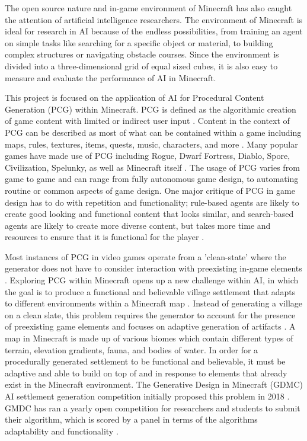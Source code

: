 \documentclass[11pt, oneside]{article}
\begin{document}
\begin{normalsize}
The open source nature and in-game environment of Minecraft has also caught the attention of artificial intelligence researchers. The environment of Minecraft is ideal for research in AI because of the endless possibilities, from training an agent on simple tasks like searching for a specific object or material, to building complex structures or navigating obstacle courses. Since the environment is divided into a three-dimensional grid of equal sized cubes, it is also easy to measure and evaluate the performance of AI in Minecraft.

This project is focused on the application of AI for Procedural Content Generation (PCG) within Minecraft. PCG is defined as the algorithmic creation of game content with limited or indirect user input \cite{shaker2016procedural}. Content in the context of PCG can be described as most of what can be contained within a game including maps, rules, textures, items, quests, music, characters, and more \cite{shaker2016procedural}. Many popular games have made use of PCG including Rogue, Dwarf Fortress, Diablo, Spore, Civilization, Spelunky, as well as Minecraft itself \cite{shaker2016procedural}. The usage of PCG varies from game to game and can range from fully autonomous game design, to  automating routine or common aspects of game design. One major critique of PCG in game design has to do with repetition and functionality; rule-based agents are likely to create good looking and functional content that looks similar, and search-based agents are likely to create more diverse content, but takes more time and resources to ensure that it is functional for the player \cite{green_organic_2019}.

Most instances of PCG in video games operate from a 'clean-state' where the generator does not have to consider interaction with preexisting in-game elements \cite{green_organic_2019}. Exploring PCG within Minecraft opens up a new challenge within AI, in which the goal is to produce a functional and believable village settlement that adapts to different environments within a Minecraft map \cite{salge_generative_2019}. Instead of generating a village on a clean slate, this problem requires the generator to account for the presence of preexisting game elements and focuses on adaptive generation of artifacts \cite{green_organic_2019}. A map in Minecraft is made up of various biomes which contain different types of terrain, elevation gradients, fauna, and bodies of water. In order for a procedurally generated settlement to be functional and believable, it must be adaptive and able to build on top of and in response to elements that already exist in the Minecraft environment. The Generative Design in Minecraft (GDMC) AI settlement generation competition initially proposed this problem in 2018 \cite{salge_generative_2018}. GMDC has ran a yearly open competition for researchers and students to submit their algorithm, which is scored by a panel in terms of the algorithms adaptability and functionality \cite{fridh_settlement_nodate}. 


\end{normalsize}
\end{document}
